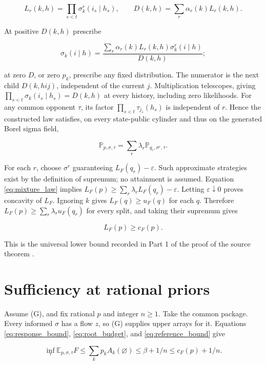 \documentclass[11pt,a4paper]{article}
\begin{document}
\[
L_r(k,h)=\prod_{s<t}\sigma^r_k(i_s\mid h_s),\qquad
D(k,h)=\sum_r\alpha_r(k)L_r(k,h).
\]

At positive \(D(k,h)\) prescribe

\[
\sigma_k(i\mid h)=
\frac{\sum_r\alpha_r(k)L_r(k,h)\sigma^r_k(i\mid h)}{D(k,h)};
\]

at zero \(D\), or zero \(p_k\), prescribe any fixed distribution. The numerator is the next child \(D(k,hi j)\), independent of the current \(j\). Multiplication telescopes, giving \(\prod_{s<t}\sigma_k(i_s\mid h_s)=D(k,h)\) at every history, including zero likelihoods. For any common opponent \(\tau\), its factor \(\prod_{s<t}\tau_{j_s}(h_s)\) is independent of \(r\). Hence the constructed law satisfies, on every state-public cylinder and thus on the generated Borel sigma field,

\begin{equation}
\mathbb P_{p,\sigma,\tau}
 =\sum_r\lambda_r\mathbb P_{q_r,\sigma^r,\tau}. \label{eq:mixture_law}
\end{equation}

For each \(r\), choose \(\sigma^r\) guaranteeing \(L_F(q_r)-\varepsilon\). Such approximate strategies exist by the definition of supremum; no attainment is assumed. Equation \eqref{eq:mixture_law} implies \(L_F(p)\ge\sum_r\lambda_rL_F(q_r)-\varepsilon\). Letting \(\varepsilon\downarrow0\) proves concavity of \(L_F\). Ignoring \(k\) gives \(L_F(q)\ge u_F(q)\) for each \(q\). Therefore \(L_F(p)\ge\sum_r\lambda_ru_F(q_r)\) for every split, and taking their supremum gives

\begin{equation}
L_F(p)\ge c_F(p). \label{eq:universal_lower}
\end{equation}

This is the universal lower bound recorded in Part 1 of the proof of the source theorem \cite{KLS}.

\section{Sufficiency at rational priors}

Assume (G), and fix rational \(p\) and integer \(n\ge1\). Take the common package. Every informed \(\sigma\) has a flow \(z\), so (G) supplies upper arrays for it. Equations \eqref{eq:response_bound}, \eqref{eq:root_budget}, and \eqref{eq:reference_bound} give

\[
\inf_\tau\mathbb E_{p,\sigma,\tau}F
\le\sum_kp_kA_k(\varnothing)
\le\beta+1/n\le c_F(p)+1/n.
\]
\end{document}
